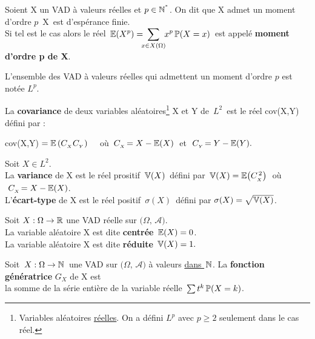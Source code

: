 \vspace{1.6cm}

Soient X un VAD à valeurs réelles et \(p\in \mathbb{N}^{^*}\). On dit que X admet un moment d'ordre $p$ \ssi \,X\, est d'espérance finie.\vspace{0.1cm}\\
Si tel est le cas alors le réel \(\, \displaystyle \mathbb{E}(X^p)=\!\!\!\sum_{x\in X(\Omega)}\!\!x^p\,\mathbb{P}(X=x)\,\) est appelé \textbf{moment d'ordre p de X}.\vspace{0.2cm}

\begin{small}
    \noindent L'ensemble des VAD à valeurs réelles qui admettent un moment d'ordre $p$ est notée \(L^p\).
\end{small}

\vspace{2cm}

La \textbf{covariance} de deux variables aléatoires\footnote{Variables aléatoires \underline{réelles}. On a défini $\displaystyle L^p$ avec $p\geq 2$ seulement dans le cas réel.} X et Y de \(\,L^2\,\) est le réel cov(X,Y) défini par :\vspace{0.1cm}

\hspace{3cm}cov(X,Y)\,\(\,=\mathbb{E}\,(C_{_X}C_{_Y})\quad \) où \(\:C_{_X}\!=X-\mathbb{E}(X)\;\) et \(\;C_{_Y}\!=Y-\mathbb{E}(Y).\)

\vspace{1.6cm}

Soit \(X\in L^2\).\\
La \textbf{variance} de X est le réel prositif \(\,\mathbb{V}(X)\,\) défini par \(\,\mathbb{V}(X)=\mathbb{E}\bigl(C_{_X}^{\,2}\bigr)\;\) où \(\,\,C_{_X}\!=X-\mathbb{E}(X)\).\vspace{0.15cm}\\
L'\textbf{écart-type} de X est le réel positif \(\,\sigma(X)\,\) défini par \(\sigma(X)=\sqrt{\mathbb{V}(X)}\).

\vspace{1.8cm}

Soit \(X:\Omega \to \mathbb{R}\) une VAD réelle sur \(\bigl(\Omega,\,\mathcal{A}\bigr)\).\\
La variable aléatoire X est dite \textbf{centrée} \ssi \(\,\mathbb{E}(X)=0\).\\
La variable aléatoire X est dite \textbf{réduite} \ssi \(\,\mathbb{V}(X)=1.\)

\vspace{1.7cm}

Soit \(\,X:\Omega \to \mathbb{N}\,\) une VAD sur \(\bigl(\Omega,\,\mathcal{A}\bigr)\) à valeurs \underline{dans \(\,\mathbb{N}\)}. La \textbf{fonction génératrice} \(G_X\) de X est\vspace{0.1cm}\\
la somme de la série entière de la variable réelle \(\,\sum t^k\,\mathbb{P}(X=k)\).

\newpage